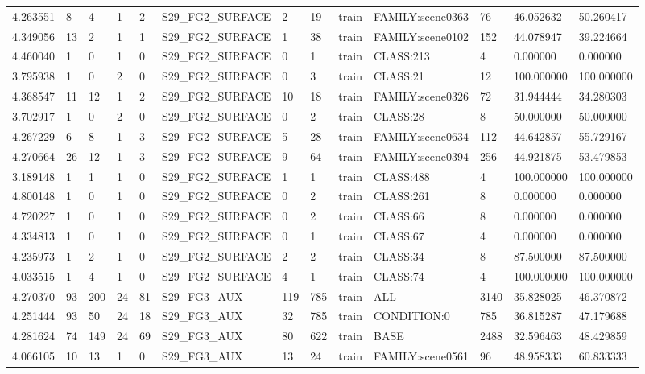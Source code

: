 \begin{tabular}{lllllllllllll}
4.263551 & 8 & 4 & 1 & 2 & S29\_FG2\_SURFACE & 2 & 19 & train & FAMILY:scene0363 & 76 & 46.052632 & 50.260417 \\
4.349056 & 13 & 2 & 1 & 1 & S29\_FG2\_SURFACE & 1 & 38 & train & FAMILY:scene0102 & 152 & 44.078947 & 39.224664 \\
4.460040 & 1 & 0 & 1 & 0 & S29\_FG2\_SURFACE & 0 & 1 & train & CLASS:213 & 4 & 0.000000 & 0.000000 \\
3.795938 & 1 & 0 & 2 & 0 & S29\_FG2\_SURFACE & 0 & 3 & train & CLASS:21 & 12 & 100.000000 & 100.000000 \\
4.368547 & 11 & 12 & 1 & 2 & S29\_FG2\_SURFACE & 10 & 18 & train & FAMILY:scene0326 & 72 & 31.944444 & 34.280303 \\
3.702917 & 1 & 0 & 2 & 0 & S29\_FG2\_SURFACE & 0 & 2 & train & CLASS:28 & 8 & 50.000000 & 50.000000 \\
4.267229 & 6 & 8 & 1 & 3 & S29\_FG2\_SURFACE & 5 & 28 & train & FAMILY:scene0634 & 112 & 44.642857 & 55.729167 \\
4.270664 & 26 & 12 & 1 & 3 & S29\_FG2\_SURFACE & 9 & 64 & train & FAMILY:scene0394 & 256 & 44.921875 & 53.479853 \\
3.189148 & 1 & 1 & 1 & 0 & S29\_FG2\_SURFACE & 1 & 1 & train & CLASS:488 & 4 & 100.000000 & 100.000000 \\
4.800148 & 1 & 0 & 1 & 0 & S29\_FG2\_SURFACE & 0 & 2 & train & CLASS:261 & 8 & 0.000000 & 0.000000 \\
4.720227 & 1 & 0 & 1 & 0 & S29\_FG2\_SURFACE & 0 & 2 & train & CLASS:66 & 8 & 0.000000 & 0.000000 \\
4.334813 & 1 & 0 & 1 & 0 & S29\_FG2\_SURFACE & 0 & 1 & train & CLASS:67 & 4 & 0.000000 & 0.000000 \\
4.235973 & 1 & 2 & 1 & 0 & S29\_FG2\_SURFACE & 2 & 2 & train & CLASS:34 & 8 & 87.500000 & 87.500000 \\
4.033515 & 1 & 4 & 1 & 0 & S29\_FG2\_SURFACE & 4 & 1 & train & CLASS:74 & 4 & 100.000000 & 100.000000 \\
4.270370 & 93 & 200 & 24 & 81 & S29\_FG3\_AUX & 119 & 785 & train & ALL & 3140 & 35.828025 & 46.370872 \\
4.251444 & 93 & 50 & 24 & 18 & S29\_FG3\_AUX & 32 & 785 & train & CONDITION:0 & 785 & 36.815287 & 47.179688 \\
4.281624 & 74 & 149 & 24 & 69 & S29\_FG3\_AUX & 80 & 622 & train & BASE & 2488 & 32.596463 & 48.429859 \\
4.066105 & 10 & 13 & 1 & 0 & S29\_FG3\_AUX & 13 & 24 & train & FAMILY:scene0561 & 96 & 48.958333 & 60.833333 \\

\end{tabular}
